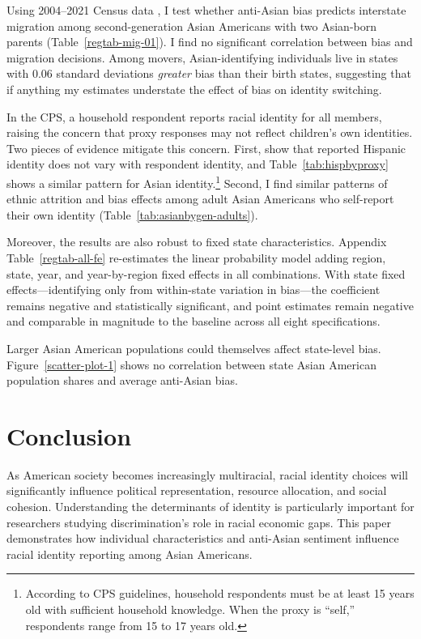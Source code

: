 Using 2004--2021 Census data \autocite{floodsarahIntegratedPublicUse2021}, I test whether anti-Asian bias predicts interstate migration among second-generation Asian Americans with two Asian-born parents (Table~\ref{regtab-mig-01}). I find no significant correlation between bias and migration decisions. Among movers, Asian-identifying individuals live in states with 0.06 standard deviations \emph{greater} bias than their birth states, suggesting that if anything my estimates understate the effect of bias on identity switching.

In the CPS, a household respondent reports racial identity for all members, raising the concern that proxy responses may not reflect children's own identities. Two pieces of evidence mitigate this concern. First, \textcite{duncanIntermarriageIntergenerationalTransmission2011} show that reported Hispanic identity does not vary with respondent identity, and Table~\ref{tab:hispbyproxy} shows a similar pattern for Asian identity.\footnote{According to CPS guidelines, household respondents must be at least 15 years old with sufficient household knowledge. When the proxy is ``self,'' respondents range from 15 to 17 years old.} Second, I find similar patterns of ethnic attrition and bias effects among adult Asian Americans who self-report their own identity (Table~\ref{tab:asianbygen-adults}).

Moreover, the results are also robust to fixed state characteristics. Appendix Table~\ref{regtab-all-fe} re-estimates the linear probability model adding region, state, year, and year-by-region fixed effects in all combinations. With state fixed effects---identifying only from within-state variation in bias---the coefficient remains negative and statistically significant, and point estimates remain negative and comparable in magnitude to the baseline across all eight specifications.

Larger Asian American populations could themselves affect state-level bias. Figure~\ref{scatter-plot-1} shows no correlation between state Asian American population shares and average anti-Asian bias.

\section{Conclusion}\label{sec:conc}

As American society becomes increasingly multiracial, racial identity choices will significantly influence political representation, resource allocation, and social cohesion. Understanding the determinants of identity is particularly important for researchers studying discrimination's role in racial economic gaps. This paper demonstrates how individual characteristics and anti-Asian sentiment influence racial identity reporting among Asian Americans.
 
